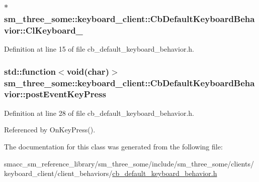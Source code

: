 \subsubsection[{\texorpdfstring{Cl\+Keyboard\+\_\+}{ClKeyboard_}}]{$\ast$ sm\+\_\+three\+\_\+some\+::keyboard\+\_\+client\+::\+Cb\+Default\+Keyboard\+Behavior\+::\+Cl\+Keyboard\+\_\+}\hypertarget{classsm__three__some_1_1keyboard__client_1_1CbDefaultKeyboardBehavior_ade54c021bbc1675dfc2a599410338f39}{}\label{classsm__three__some_1_1keyboard__client_1_1CbDefaultKeyboardBehavior_ade54c021bbc1675dfc2a599410338f39}


Definition at line 15 of file cb\+\_\+default\+\_\+keyboard\+\_\+behavior.\+h.

\subsubsection[{\texorpdfstring{post\+Event\+Key\+Press}{postEventKeyPress}}]{\setlength{\rightskip}{0pt plus 5cm}std\+::function$<$void(char)$>$ sm\+\_\+three\+\_\+some\+::keyboard\+\_\+client\+::\+Cb\+Default\+Keyboard\+Behavior\+::post\+Event\+Key\+Press}\hypertarget{classsm__three__some_1_1keyboard__client_1_1CbDefaultKeyboardBehavior_a9ad347df51cea719d08dc2d0024b2412}{}\label{classsm__three__some_1_1keyboard__client_1_1CbDefaultKeyboardBehavior_a9ad347df51cea719d08dc2d0024b2412}


Definition at line 28 of file cb\+\_\+default\+\_\+keyboard\+\_\+behavior.\+h.



Referenced by On\+Key\+Press().



The documentation for this class was generated from the following file\+:\begin{DoxyCompactItemize}
\item 
smacc\+\_\+sm\+\_\+reference\+\_\+library/sm\+\_\+three\+\_\+some/include/sm\+\_\+three\+\_\+some/clients/keyboard\+\_\+client/client\+\_\+behaviors/\hyperlink{cb__default__keyboard__behavior_8h}{cb\+\_\+default\+\_\+keyboard\+\_\+behavior.\+h}\end{DoxyCompactItemize}
